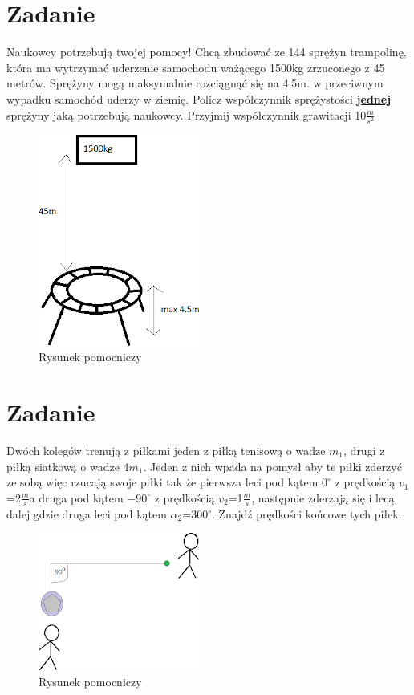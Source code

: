 \documentclass[14pt]{extarticle}
\begin{document}
    \section{Zadanie}
    \begin{flushleft}
        Naukowcy potrzebują twojej pomocy! Chcą zbudować ze 144 sprężyn trampolinę, która ma wytrzymać uderzenie samochodu ważącego 1500kg zrzuconego z 45 metrów.
        Sprężyny mogą maksymalnie rozciągnąć się na 4,5m. w przeciwnym wypadku samochód uderzy w ziemię.
        Policz współczynnik sprężystości \textbf{\underline{jednej}} sprężyny jaką potrzebują naukowcy.
        Przyjmij współczynnik grawitacji 10$\frac{m}{s^2}$
    \end{flushleft}
    \begin{figure}[H]
        \centering
        \includegraphics{trampolina}
        \caption{Rysunek pomocniczy}
    \end{figure}
    \clearpage
    \section{Zadanie}
    \begin{flushleft}
        Dwóch kolegów trenują z piłkami jeden z piłką tenisową o wadze $m_1$, drugi z piłką siatkową o wadze $4m_1$. Jeden z nich wpada na pomysł aby te piłki zderzyć ze sobą więc rzucają swoje piłki tak że
        pierwsza leci pod kątem $0^\circ$ z prędkością $v_1$=2$\frac{m}{s}$a druga pod kątem $-90^\circ$ z prędkością $v_2$=1$\frac{m}{s}$,
        następnie zderzają się i lecą dalej gdzie druga leci pod kątem $\alpha _2$=300$^\circ$.
        Znajdź prędkości końcowe tych piłek.
    \end{flushleft}
    \begin{figure}[H]
        \centering
        \includegraphics{pilki}
        \caption{Rysunek pomocniczy}
    \end{figure}
    \clearpage
\end{document}
